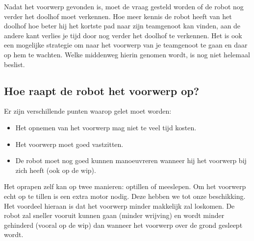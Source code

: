 \documentclass{peno}
\begin{document}
Nadat het voorwerp gevonden is, moet de vraag gesteld worden of de robot nog verder het doolhof moet verkennen. Hoe meer kennis de robot heeft van het doolhof hoe beter hij het kortste pad naar zijn teamgenoot kan vinden, aan de andere kant verlies je tijd door nog verder het doolhof te verkennen. Het is ook een mogelijke strategie om naar het voorwerp van je teamgenoot te gaan en daar op hem te wachten. Welke middenweg hierin genomen wordt, is nog niet helemaal beslist.




\newpage

\subsection*{Hoe raapt de robot het voorwerp op?}
Er zijn verschillende punten waarop gelet moet worden:

\begin{itemize}
\item Het opnemen van het voorwerp mag niet te veel tijd kosten.
\item Het voorwerp moet goed vastzitten.
\item De robot moet nog goed kunnen manoeuvreren wanneer hij het voorwerp bij zich heeft (ook op de wip).
\end{itemize} 

Het oprapen zelf kan op twee manieren: optillen of meeslepen. Om het voorwerp echt op te tillen is een extra motor nodig. Deze hebben we tot onze beschikking. Het voordeel hieraan is dat het voorwerp minder makkelijk zal loskomen. De robot zal sneller vooruit kunnen gaan (minder wrijving) en wordt minder gehinderd (vooral op de wip) dan wanneer het voorwerp over de grond gesleept wordt.
\end{document}
